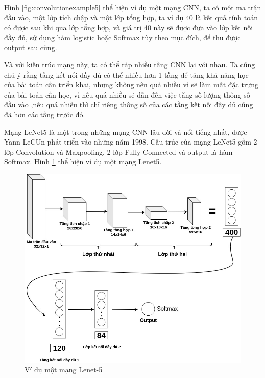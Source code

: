 Hình \ref{fig:convolutionexample5} thể hiện ví dụ một mạng CNN, ta có một ma trận đầu vào, một lớp tích chập và một lớp tổng hợp, ta ví dụ 40 là kết quả tính toán có được sau khi qua lớp tổng hợp, và giá trị 40 này sẽ được đưa vào lớp kết nối đầy đủ, sử dụng hàm logistic hoặc Softmax tùy theo mục đích, để thu được output sau cùng.

Và với kiến trúc mạng này, ta có thể ráp nhiều tầng CNN lại với nhau. Ta cũng chú ý rằng tầng kết nối đầy đủ có thể nhiều hơn 1 tầng để tăng khả năng học của bài toán cần triển khai, nhưng không nên quá nhiều vì sẽ làm mất đặc trưng của bài toán cần học, vì nếu quá nhiều sẽ dẫn đến việc tăng số lượng thông số đầu vào ,nếu quá nhiều thì chỉ riêng thông số của các tầng kết nối đầy dủ cũng đã hơn các tầng trước đó.

Mạng LeNet5 là một trong những mạng CNN lâu đời và nổi tiếng nhất, được Yann LeCUn phát triển vào những năm 1998. Cấu trúc của mạng LeNet5 gồm 2 lớp Convolution và Maxpooling, 2 lớp Fully Connected và output là hàm Softmax. Hình \ref{fig:lenetexample} thể hiện ví dụ một mạng Lenet5.

\begin{figure}[!h]
	\centering
		\includegraphics[width=1\columnwidth]{chapter05/figure/lenet-example.jpg}
        \caption{Ví dụ một mạng Lenet-5}
        \label{fig:lenetexample}
\end{figure}

